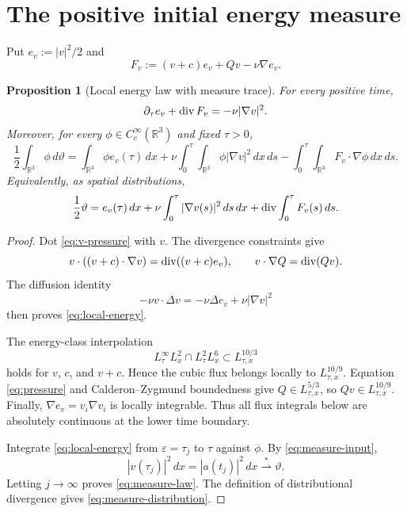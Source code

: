 \documentclass[11pt]{article}
\newtheorem{proposition}[theorem]{Proposition}
\theoremstyle{remark}
\newcommand{\R}{\mathbb R}
\newcommand{\weakstarto}{\overset{*}{\rightharpoonup}}
\newcommand{\diver}{\mathop{\rm div}}
\begin{document}
\section{The positive initial energy measure}

Put \(e_v:=|v|^2/2\) and
\begin{equation}
\label{eq:flux}
 F_v:=(v+c)e_v+Qv-\nu\nabla e_v.
\end{equation}

\begin{proposition}[Local energy law with measure trace]
\label{prop:local-energy}
For every positive time,
\begin{equation}
\label{eq:local-energy}
 \partial_\tau e_v+\diver F_v=-\nu|\nabla v|^2.
\end{equation}
Moreover, for every \(\phi\in C_c^\infty(\R^3)\) and fixed \(\tau>0\),
\begin{equation}
\label{eq:measure-law}
 \frac12\int_{\R^3}\phi\,d\vartheta
 =
 \int_{\R^3}\phi e_v(\tau)\,dx
 +\nu\int_0^\tau\!\!\int_{\R^3}
       \phi|\nabla v|^2\,dx\,ds
 -\int_0^\tau\!\!\int_{\R^3}
       F_v\cdot\nabla\phi\,dx\,ds.
\end{equation}
Equivalently, as spatial distributions,
\begin{equation}
\label{eq:measure-distribution}
 \frac12\vartheta
 =
 e_v(\tau)\,dx+
 \nu\int_0^\tau|\nabla v(s)|^2\,ds\,dx+
 \diver\int_0^\tau F_v(s)\,ds.
\end{equation}
\end{proposition}

\begin{proof}
Dot \eqref{eq:v-pressure} with \(v\).  The divergence constraints give
\[
 v\cdot((v+c)\cdot\nabla v)
 =\diver((v+c)e_v),\qquad
 v\cdot\nabla Q=\diver(Qv).
\]
The diffusion identity
\[
 -\nu v\cdot\Delta v
 =-\nu\Delta e_v+\nu|\nabla v|^2
\]
then proves \eqref{eq:local-energy}.

The energy-class interpolation
\[
 L^\infty_\tau L^2_x\cap L^2_\tau L^6_x
 \subset L^{10/3}_{\tau,x}
\]
holds for \(v\), \(c\), and \(v+c\).  Hence the cubic flux belongs
locally to \(L^{10/9}_{\tau,x}\).  Equation \eqref{eq:pressure} and
Calderon--Zygmund boundedness give \(Q\in L^{5/3}_{\tau,x}\), so
\(Qv\in L^{10/9}_{\tau,x}\).  Finally,
\(\nabla e_v=v_i\nabla v_i\) is locally integrable.  Thus all flux
integrals below are absolutely continuous at the lower time boundary.

Integrate \eqref{eq:local-energy} from
\(\varepsilon=\tau_j\) to \(\tau\) against \(\phi\).  By
\eqref{eq:measure-input},
\[
 |v(\tau_j)|^2\,dx=|a(t_j)|^2\,dx
 \weakstarto\vartheta.
\]
Letting \(j\to\infty\) proves \eqref{eq:measure-law}.
The definition of distributional divergence gives
\eqref{eq:measure-distribution}.
\end{proof}
\end{document}
